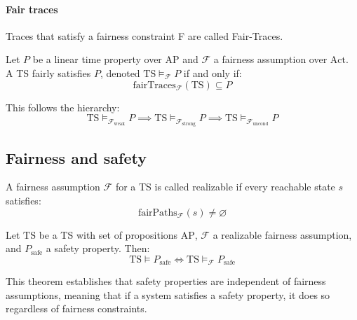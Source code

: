 \paragraph*{Fair traces}
Traces that satisfy a fairness constraint F are called Fair-Traces.
\begin{definition}
    Let $P$ be a linear time property over $\text{AP}$ and $\mathcal{F}$ a fairness assumption over $\text{Act}$. 
    A TS fairly satisfies $P$, denoted $\text{TS} \models_{\mathcal{F}} P$ if and only if: 
    \[\text{fairTraces}_{\mathcal{F}}(\text{TS})\subseteq P\]

\end{definition}
\noindent This follows the hierarchy: 
\[\text{TS} \models_{\mathcal{F}_{\text{weak}}} P \implies \text{TS} \models_{\mathcal{F}_{\text{strong}}} P \implies \text{TS} \models_{\mathcal{F}_{\text{uncond}}} P\]

\subsection{Fairness and safety}
\begin{definition}
    A fairness assumption $\mathcal{F}$ for a TS is called realizable if every reachable state $s$  satisfies:
    \[\text{fairPaths}_\mathcal{F} (s) \neq \varnothing\]
\end{definition}
\begin{theorem}
    Let $\text{TS}$ be a TS with set of propositions $\text{AP}$, $\mathcal{F}$ a realizable fairness assumption, and $P_{\text{safe}}$ a safety property. 
    Then:
    \[\text{TS}\models P_{\text{safe}} \Leftrightarrow \text{TS}\models_{\mathcal{F}} P_{\text{safe}}\]
\end{theorem}
\noindent This theorem establishes that safety properties are independent of fairness assumptions, meaning that if a system satisfies a safety property, it does so regardless of fairness constraints.